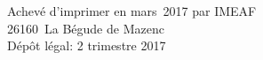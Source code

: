 \cleardoublepage
\mbox{}
\vfill

{\scriptsize
\begin{center}
Achevé d'imprimer en mars~2017 par IMEAF \\
26160~La Bégude de Mazenc \\[\baselineskip]

Dépôt légal: 2 trimestre 2017
\end{center}
}
\enlargethispage{\footskip}


